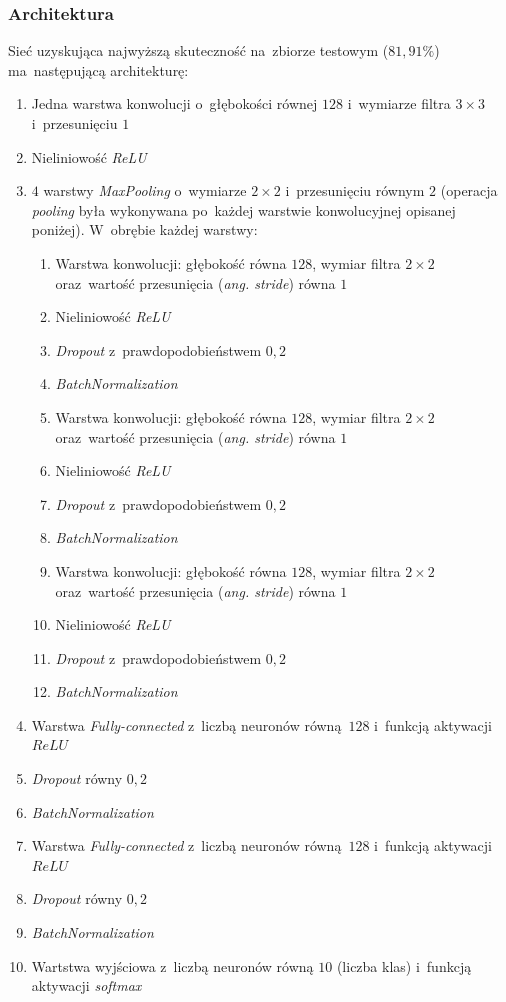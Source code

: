 \documentclass[11pt, a4paper]{article}
\begin{document}
\subsubsection{Architektura}
Sieć uzyskująca najwyższą skuteczność na~zbiorze testowym ($81,91\%$) ma~następującą architekturę:
\begin{enumerate}
    \item Jedna warstwa konwolucji o~głębokości równej $128$ i~wymiarze filtra $3 \times 3$ i~przesunięciu $1$
    \item Nieliniowość \textit{ReLU}
    \item $4$ warstwy \textit{MaxPooling} o~wymiarze $2 \times 2$ i~przesunięciu równym $2$ (operacja \textit{pooling} była wykonywana po~każdej warstwie konwolucyjnej opisanej poniżej). W~obrębie każdej warstwy:
        \begin{enumerate}
            \item Warstwa konwolucji: głębokość równa $128$, wymiar filtra $2 \times 2$ oraz~wartość przesunięcia (\textit{ang. stride}) równa $1$
            \item Nieliniowość \textit{ReLU}
            \item \textit{Dropout} z~prawdopodobieństwem $0,2$
            \item \textit{BatchNormalization}
            \item Warstwa konwolucji: głębokość równa $128$, wymiar filtra $2 \times 2$ oraz~wartość przesunięcia (\textit{ang. stride}) równa $1$
            \item Nieliniowość \textit{ReLU}
            \item \textit{Dropout} z~prawdopodobieństwem $0,2$
            \item \textit{BatchNormalization}
            \item Warstwa konwolucji: głębokość równa $128$, wymiar filtra $2 \times 2$ oraz~wartość przesunięcia (\textit{ang. stride}) równa $1$
            \item Nieliniowość \textit{ReLU}
            \item \textit{Dropout} z~prawdopodobieństwem $0,2$
            \item \textit{BatchNormalization}
        \end{enumerate}
    \item Warstwa \textit{Fully-connected} z~liczbą neuronów równą~$128$ i~funkcją aktywacji $ReLU$
    \item \textit{Dropout} równy $0,2$
    \item \textit{BatchNormalization}
    \item Warstwa \textit{Fully-connected} z~liczbą neuronów równą~$128$ i~funkcją aktywacji $ReLU$
    \item \textit{Dropout} równy $0,2$
    \item \textit{BatchNormalization}
    \item Wartstwa wyjściowa z~liczbą neuronów równą $10$ (liczba klas) i~funkcją aktywacji \textit{softmax}
\end{enumerate}
\end{document}
